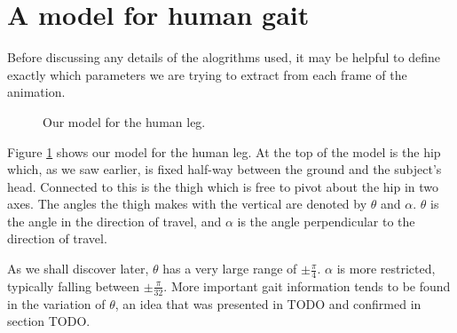 \section{A model for human gait}

Before discussing any details of the alogrithms used, it may be helpful to define exactly which parameters
we are trying to extract from each frame of the animation.

\begin{figure}[b]
	\centering
	\qquad
	\caption{Our model for the human leg.}
	\label{ModelImages}
\end{figure}

Figure \ref{ModelImages} shows our model for the human leg.
At the top of the model is the hip which, as we saw earlier, is fixed half-way between the ground and the subject's head.
Connected to this is the thigh which is free to pivot about the hip in two axes.
The angles the thigh makes with the vertical are denoted by $\theta$ and $\alpha$.
$\theta$ is the angle in the direction of travel, and $\alpha$ is the angle perpendicular to the direction of travel.

As we shall discover later, $\theta$ has a very large range of $\pm \frac{\pi}{4}$.
$\alpha$ is more restricted, typically falling between $\pm \frac{\pi}{32}$.
More important gait information tends to be found in the variation of $\theta$, an idea that was presented in TODO
and confirmed in section TODO.
